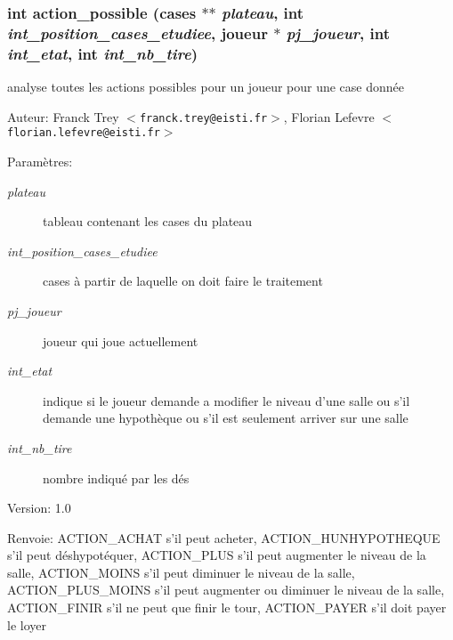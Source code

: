 \subsubsection{\setlength{\rightskip}{0pt plus 5cm}int action\_\-possible ({\bf cases} $\ast$$\ast$ {\em plateau}, int {\em int\_\-position\_\-cases\_\-etudiee}, {\bf joueur} $\ast$ {\em pj\_\-joueur}, int {\em int\_\-etat}, int {\em int\_\-nb\_\-tire})}\label{outils_8h_d1c532cdedd8b070691946cc83436c96}


analyse toutes les actions possibles pour un joueur pour une case donn\'{e}e 

\begin{Desc}
\item[Auteur:]Franck Trey $<${\tt franck.trey@eisti.fr}$>$, Florian Lefevre $<${\tt florian.lefevre@eisti.fr}$>$\end{Desc}
\begin{Desc}
\item[Param\`{e}tres:]
\begin{description}
\item[{\em plateau}]tableau contenant les cases du plateau \item[{\em int\_\-position\_\-cases\_\-etudiee}]cases \`{a} partir de laquelle on doit faire le traitement \item[{\em pj\_\-joueur}]joueur qui joue actuellement \item[{\em int\_\-etat}]indique si le joueur demande a modifier le niveau d'une salle ou s'il demande une hypoth\`{e}que ou s'il est seulement arriver sur une salle \item[{\em int\_\-nb\_\-tire}]nombre indiqu\'{e} par les d\'{e}s\end{description}
\end{Desc}
\begin{Desc}
\item[Version:]1.0 \end{Desc}
\begin{Desc}
\item[Renvoie:]ACTION\_\-ACHAT s'il peut acheter, ACTION\_\-HUNHYPOTHEQUE s'il peut d\'{e}shypot\'{e}quer, ACTION\_\-PLUS s'il peut augmenter le niveau de la salle, ACTION\_\-MOINS s'il peut diminuer le niveau de la salle, ACTION\_\-PLUS\_\-MOINS s'il peut augmenter ou diminuer le niveau de la salle, ACTION\_\-FINIR s'il ne peut que finir le tour, ACTION\_\-PAYER s'il doit payer le loyer \end{Desc}


